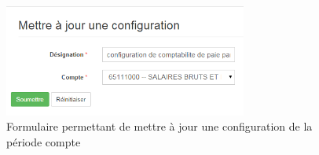 \documentclass[12pt,a4paper]{report}
\begin{document}
\begin{figure}[h]
\begin{center}
\includegraphics[width=8cm]{pic/MettreAConfig.png}
\end{center}
\caption{Formulaire permettant de mettre à jour une configuration de la période compte}
\label{Formulaire permettant de mettre à jour une configuration de la période compte}
\end{figure} 





\tableofcontents
\end{document}
